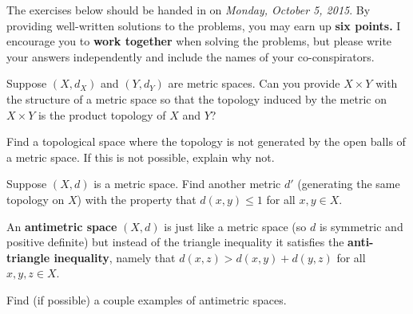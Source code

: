 \documentclass[12pt]{pset}
\author{Jim Fowler}
\date{Autumn 2015}
\begin{document}
\maketitle

\noindent The exercises below should be handed in on \textit{Monday,
  October 5, 2015}.  By providing well-written solutions to the
problems, you may earn up \textbf{six points.}  I encourage you to
\textbf{work together} when solving the problems, but please write
your answers independently and include the names of your
co-conspirators.

\begin{problem}

Suppose $(X,d_X)$ and $(Y,d_Y)$ are metric spaces.  Can you provide $X \times Y$ with the structure of a metric space so that the topology induced by the metric on $X \times Y$ is the product topology of $X$ and $Y$?

\end{problem}

\begin{problem}
  Find a topological space where the topology is not generated by the open balls of a metric space.  If this is not possible, explain why not.
\end{problem}

\begin{problem}
  Suppose $(X,d)$ is a metric space.  Find another metric $d'$
  (generating the same topology on $X$) with the property that
  $d(x,y) \leq 1$ for all $x,y \in X$.
\end{problem}

\begin{problem}
  An \textbf{antimetric space} $(X,d)$ is just like a metric space (so $d$ is symmetric and positive definite) but instead of the triangle inequality it satisfies the \textbf{anti-triangle inequality}, namely that $d(x,z) > d(x,y) + d(y,z)$ for all $x,y,z \in X$.

  Find (if possible) a couple examples of antimetric spaces.
\end{problem}
\end{document}
